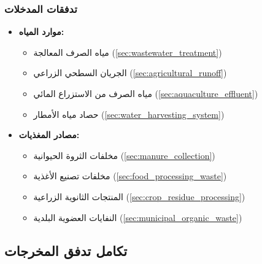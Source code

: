 \subsubsection{تدفقات المدخلات}
\begin{itemize}
    \item \textbf{موارد المياه:}
    \begin{itemize}
        \item مياه الصرف المعالجة (\ref{sec:wastewater_treatment})
        \item الجريان السطحي الزراعي (\ref{sec:agricultural_runoff})
        \item مياه الصرف من الاستزراع المائي (\ref{sec:aquaculture_effluent})
        \item حصاد مياه الأمطار (\ref{sec:water_harvesting_system})
    \end{itemize}
    
    \item \textbf{مصادر المغذيات:}
    \begin{itemize}
        \item مخلفات الثروة الحيوانية (\ref{sec:manure_collection})
        \item مخلفات تصنيع الأغذية (\ref{sec:food_processing_waste})
        \item المنتجات الثانوية الزراعية (\ref{sec:crop_residue_processing})
        \item النفايات العضوية البلدية (\ref{sec:municipal_organic_waste})
    \end{itemize}
\end{itemize}

\subsection{تكامل تدفق المخرجات}

